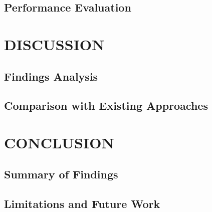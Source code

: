 \documentclass{SOICTthesis}  %
\begin{document}
\section{Performance Evaluation}
\lipsum[31-33]
\cite{b10, b11}


\chapter{DISCUSSION}
\section{Findings Analysis}
\lipsum[34-36]

\section{Comparison with Existing Approaches}
\lipsum[37-39]
\cite{b12}

\chapter{CONCLUSION}
\section{Summary of Findings}
\lipsum[40-42]

\section{Limitations and Future Work}
\lipsum[43-45]




%
\end{document}
